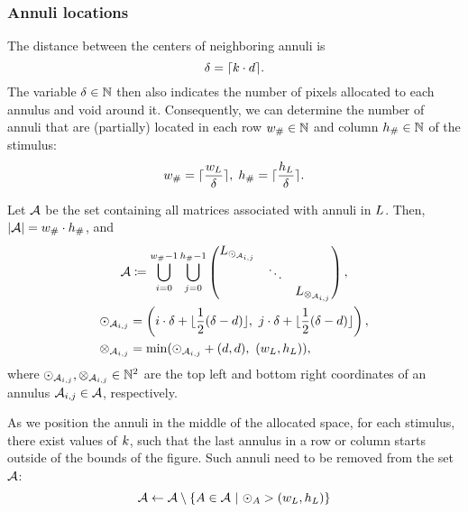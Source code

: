 \subsubsection{Annuli locations}
\label{sec:annuli-locations}

The distance between the centers of neighboring annuli is
\begin{equation}
    \delta = \lceil k \cdot d\rceil.
\end{equation}
The variable $\delta \in \mathbb{N}$ then also indicates the number of pixels allocated to each annulus and void around it. Consequently, we can determine the number of annuli that are (partially) located in each row $w_{\#} \in \mathbb{N}$ and column $h_{\#} \in \mathbb{N}$ of the stimulus:
\begin{equation}
    w_{\#} = \lceil\frac{w_L}{\delta}\rceil, \;
    h_{\#} = \lceil\frac{h_L}{\delta}\rceil. 
\end{equation}

Let $\mathcal{A}$ be the set containing all matrices associated with annuli in $L$. Then, $|\mathcal{A}| = w_{\#} \cdot h_{\#}$, and
\begin{equation}
\begin{gathered}
    \annuliset \coloneqq \bigcup_{i = 0}^{\repsinrow - 1} \bigcup_{j = 0}^{\repsincol - 1}
    \begin{pmatrix}
        \fullmatrix_{\annstart_{\annuliset_{i, j}}} & & \\
         & \ddots & \\
         & & \fullmatrix_{\annfinish_{\annuliset_{i, j}}}
    \end{pmatrix}, \\
    \begin{aligned}
    \annstart_{\annuliset_{i, j}} &= \left( 
        i \cdot \anndist + \floor{ \frac{1}{2} (\anndist - \diam) }, \ 
        j \cdot \anndist + \floor{ \frac{1}{2} (\anndist - \diam) }
    \right), \\
    \annfinish_{\annuliset_{i, j}} &=
    \min(
        \annstart_{\annuliset_{i, j}} + (d, d), \ 
        (\fullwidth, \fullheight)
    ),
    \end{aligned}
\end{gathered}
\end{equation}
where $\odot_{\mathcal{A}_{i, j}}, \otimes_{\mathcal{A}_{i, j}} \in \mathbb{N}^2$ are the top left and bottom right coordinates of an annulus $\mathcal{A}_{i, j} \in \mathcal{A}$, respectively. 

As we position the annuli in the middle of the allocated space, for each stimulus, there exist values of $k$, such that the last annulus in a row or column starts outside of the bounds of the figure. Such annuli need to be removed from the set $\mathcal{A}$:
\begin{equation}
    \mathcal{A} \leftarrow \mathcal{A} \setminus \{ A \in \mathcal{A} \ | \ \odot_A > (w_L, h_L) \}
\end{equation}